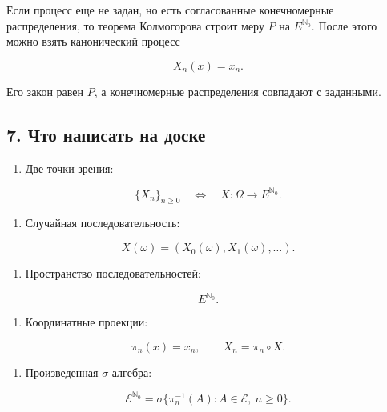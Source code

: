 \documentclass[
  11pt,
  a4paper,
]{article}
\providecommand{\tightlist}{%
  \setlength{\itemsep}{0pt}\setlength{\parskip}{0pt}}
\begin{document}
Если процесс еще не задан, но есть согласованные конечномерные
распределения, то теорема Колмогорова строит меру \(P\) на
\(E^{\mathbb N_0}\). После этого можно взять канонический процесс

\[
X_n(x)=x_n.
\]

Его закон равен \(P\), а конечномерные распределения совпадают с
заданными.

\subsection{7. Что написать на
доске}\label{ux447ux442ux43e-ux43dux430ux43fux438ux441ux430ux442ux44c-ux43dux430-ux434ux43eux441ux43aux435}

\begin{enumerate}
\def\labelenumi{\arabic{enumi}.}
\tightlist
\item
  Две точки зрения:
\end{enumerate}

\[
\{X_n\}_{n\ge0}
\quad\Longleftrightarrow\quad
X:\Omega\to E^{\mathbb N_0}.
\]

\begin{enumerate}
\def\labelenumi{\arabic{enumi}.}
\setcounter{enumi}{1}
\tightlist
\item
  Случайная последовательность:
\end{enumerate}

\[
X(\omega)=(X_0(\omega),X_1(\omega),\ldots).
\]

\begin{enumerate}
\def\labelenumi{\arabic{enumi}.}
\setcounter{enumi}{2}
\tightlist
\item
  Пространство последовательностей:
\end{enumerate}

\[
E^{\mathbb N_0}.
\]

\begin{enumerate}
\def\labelenumi{\arabic{enumi}.}
\setcounter{enumi}{3}
\tightlist
\item
  Координатные проекции:
\end{enumerate}

\[
\pi_n(x)=x_n,
\qquad
X_n=\pi_n\circ X.
\]

\begin{enumerate}
\def\labelenumi{\arabic{enumi}.}
\setcounter{enumi}{4}
\tightlist
\item
  Произведенная \(\sigma\)-алгебра:
\end{enumerate}

\[
\mathcal E^{\mathbb N_0}
=
\sigma\{\pi_n^{-1}(A):A\in\mathcal E,\ n\ge0\}.
\]
\end{document}
